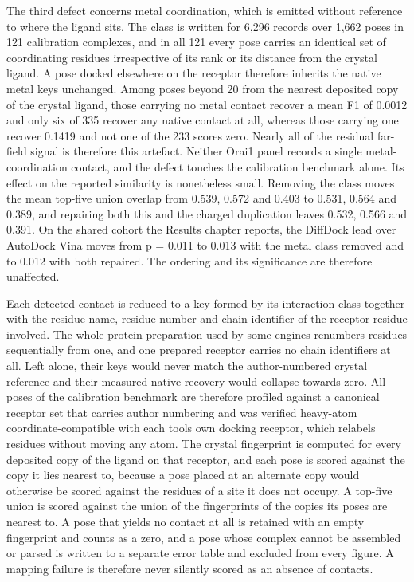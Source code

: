 The third defect concerns metal coordination, which is emitted without reference to where the ligand sits. The class is written for 6,296 records over 1,662 poses in 121 calibration complexes, and in all 121 every pose carries an identical set of coordinating residues irrespective of its rank or its distance from the crystal ligand. A pose docked elsewhere on the receptor therefore inherits the native metal keys unchanged. Among poses beyond 20\angstrom{} from the nearest deposited copy of the crystal ligand, those carrying no metal contact recover a mean F1 of 0.0012 and only six of 335 recover any native contact at all, whereas those carrying one recover 0.1419 and not one of the 233 scores zero. Nearly all of the residual far-field signal is therefore this artefact. Neither Orai1 panel records a single metal-coordination contact, and the defect touches the calibration benchmark alone. Its effect on the reported similarity is nonetheless small. Removing the class moves the mean top-five union overlap from 0.539, 0.572 and 0.403 to 0.531, 0.564 and 0.389, and repairing both this and the charged duplication leaves 0.532, 0.566 and 0.391. On the shared cohort the Results chapter reports, the DiffDock lead over AutoDock Vina moves from p = 0.011 to 0.013 with the metal class removed and to 0.012 with both repaired. The ordering and its significance are therefore unaffected.

Each detected contact is reduced to a key formed by its interaction class together with the residue name, residue number and chain identifier of the receptor residue involved. The whole-protein preparation used by some engines renumbers residues sequentially from one, and one prepared receptor carries no chain identifiers at all. Left alone, their keys would never match the author-numbered crystal reference and their measured native recovery would collapse towards zero. All poses of the calibration benchmark are therefore profiled against a canonical receptor set that carries author numbering and was verified heavy-atom coordinate-compatible with each tool\textquotesingle s own docking receptor, which relabels residues without moving any atom. The crystal fingerprint is computed for every deposited copy of the ligand on that receptor, and each pose is scored against the copy it lies nearest to, because a pose placed at an alternate copy would otherwise be scored against the residues of a site it does not occupy. A top-five union is scored against the union of the fingerprints of the copies its poses are nearest to. A pose that yields no contact at all is retained with an empty fingerprint and counts as a zero, and a pose whose complex cannot be assembled or parsed is written to a separate error table and excluded from every figure. A mapping failure is therefore never silently scored as an absence of contacts.

